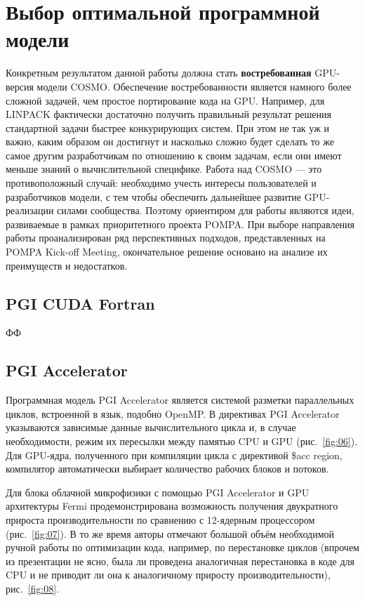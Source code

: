 \documentclass[a4,12pt]{report}
\begin{document}
\chapter{Выбор оптимальной программной модели}

Конкретным результатом данной работы должна стать \textbf{востребованная} GPU-версия модели COSMO. Обеспечение востребованности является намного более сложной задачей, чем простое портирование кода на GPU. Например, для LINPACK фактически достаточно получить правильный результат решения стандартной задачи быстрее конкурирующих систем. При этом не так уж и важно, каким образом он достигнут и насколько сложно будет сделать то же самое другим разработчикам по отношению к своим задачам, если они имеют меньше знаний о вычислительной специфике. Работа над COSMO --- это противоположный случай: необходимо учесть интересы пользователей и разработчиков модели, с тем чтобы обеспечить дальнейшее развитие GPU-реализации силами сообщества. Поэтому ориентиром для работы являются идеи, развиваемые в рамках приоритетного проекта POMPA. При выборе направления работы проанализирован ряд перспективных подходов, представленных на POMPA Kick-off Meeting, окончательное решение основано на анализе их преимуществ и недостатков.

\section{PGI CUDA Fortran}

ФФ

\section{PGI Accelerator}

Программная модель PGI Accelerator является системой разметки параллельных циклов, встроенной в язык, подобно OpenMP. В директивах PGI Accelerator указываются зависимые данные вычислительного цикла и, в случае необходимости, режим их пересылки между памятью CPU и GPU (рис.~\ref{fig:06}). Для GPU-ядра, полученного при компиляции цикла с директивой \$acc region, компилятор автоматически выбирает количество рабочих блоков и потоков.


Для блока облачной микрофизики с помощью PGI Accelerator и GPU архитектуры Fermi продемонстрирована возможность получения двукратного прироста производительности по сравнению с 12-ядерным процессором (рис.~\ref{fig:07}). В то же время авторы отмечают большой объём необходимой ручной работы по оптимизации кода, например, по перестановке циклов (впрочем из презентации не ясно, была ли проведена аналогичная перестановка в коде для CPU и не приводит ли она к аналогичному приросту производительности), рис.~\ref{fig:08}.
\end{document}
